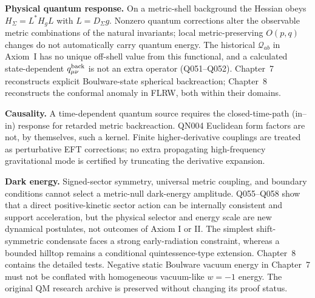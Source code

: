 \documentclass[11pt,a4paper]{article}
\begin{document}
\noindent\textbf{Physical quantum response.} On a metric-shell background the Hessian obeys $H_\Sigma=L^*H_gL$ with $L=D_\Sigma g$. Nonzero quantum corrections alter the observable metric combinations of the natural invariants; local metric-preserving $O(p,q)$ changes do not automatically carry quantum energy. The historical $\mathcal Q_{ab}$ in Axiom~I has no unique off-shell value from this functional, and a calculated state-dependent $q_{\mu\nu}^{\rm back}$ is not an extra operator (Q051--Q052). Chapter~7 reconstructs explicit Boulware-state spherical backreaction; Chapter~8 reconstructs the conformal anomaly in FLRW, both within their domains.

\noindent\textbf{Causality.} A time-dependent quantum source requires the closed-time-path (in--in) response for retarded metric backreaction. QN004 Euclidean form factors are not, by themselves, such a kernel. Finite higher-derivative couplings are treated as perturbative EFT corrections; no extra propagating high-frequency gravitational mode is certified by truncating the derivative expansion.

\noindent\textbf{Dark energy.} Signed-sector symmetry, universal metric coupling, and boundary conditions cannot select a metric-null dark-energy amplitude. Q055--Q058 show that a direct positive-kinetic sector action can be internally consistent and support acceleration, but the physical selector and energy scale are new dynamical postulates, not outcomes of Axiom I or II. The simplest shift-symmetric condensate faces a strong early-radiation constraint, whereas a bounded hilltop remains a conditional quintessence-type extension. Chapter~8 contains the detailed tests. Negative static Boulware vacuum energy in Chapter~7 must not be conflated with homogeneous vacuum-like $w=-1$ energy. The original QM research archive is preserved without changing its proof status.
\end{document}
